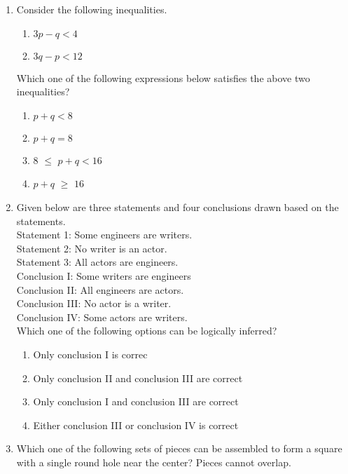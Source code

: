\documentclass[12pt]{article}
\begin{document}
\begin{enumerate}
\item Consider the following inequalities.
    \begin{enumerate}[label=(\roman*)]
        \item $3p-q<4$ 
        \item $3q-p<12$
    \end{enumerate}

    Which one of the following expressions below satisfies the above two
inequalities?
\begin{enumerate}
    

\item $p+q<8$
\item$p+q=8$
\item $8$ {$\le$} $p+q<16$
\item $p+q$ $\ge$ $16$
\end{enumerate}



\item Given below are three statements and four conclusions drawn based on the
statements. \\

Statement 1: Some engineers are writers.\\
Statement 2: No writer is an actor.\\
Statement 3: All actors are engineers.\\

Conclusion I: Some writers are engineers\\
Conclusion II: All engineers are actors.\\
Conclusion III: No actor is a writer.\\
Conclusion IV: Some actors are writers.\\

Which one of the following options can be logically inferred?

\begin{enumerate}
    

\item Only conclusion I is correc
\item Only conclusion II and conclusion III are correct 
\item Only conclusion I and conclusion III are correct
\item Either conclusion III or conclusion IV is correct
\end{enumerate}


\item Which one of the following sets of pieces can be assembled to form a square
with a single round hole near the center? Pieces cannot overlap.


\end{enumerate}
\end{document}
